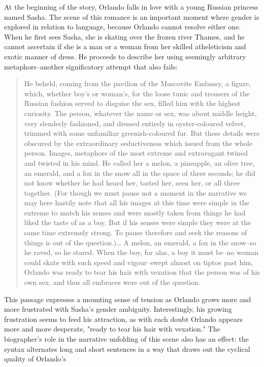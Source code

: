 \documentclass[11pt]{article}
\begin{document}
At the beginning of the story, Orlando falls in love with a young
Russian princess named Sasha. The scene of this romance is an
important moment where gender is explored in relation to language,
because Orlando cannot resolve either one. When he first sees Sasha,
she is skating over the frozen river Thames, and he cannot ascertain
if she is a man or a woman from her skilled atheleticism and exotic
manner of dress. He proceeds to describe her using seemingly arbitrary
metaphors--another significatory attempt that also fails:
\begin{quote}
He beheld, coming from the pavilion of the Muscovite Embassy, a
figure, which, whether boy's or woman's, for the loose tunic and
trousers of the Russian fashion served to disguise the sex, filled him
with the highest curiosity. The person, whatever the name or sex, was
about middle height, very slenderly fashioned, and dressed entirely in
oyster-coloured velvet, trimmed with some unfamiliar greenish-coloured
fur. But these details were obscured by the extraordinary
seductiveness which issued from the whole person. Images, metaphors of
the most extreme and extravagant twined and twisted in his mind. He
called her a melon, a pineapple, an olive tree, an emerald, and a fox
in the snow all in the space of three seconds; he did not know whether
he had heard her, tasted her, seen her, or all three together. (For
though we must pause not a moment in the narrative we may here hastily
note that all his images at this time were simple in the extreme to
match his senses and were mostly taken from things he had liked the
taste of as a boy. But if his senses were simple they were at the same
time extremely strong. To pause therefore and seek the reasons of
things is out of the question.)\ldots{} A melon, an emerald, a fox in the
snow--so he raved, so he stared. When the boy, for alas, a boy it must
be--no woman could skate with such speed and vigour--swept almost on
tiptoe past him, Orlando was ready to tear his hair with vexation that
the person was of his own sex, and thus all embraces were out of the
question. 
\end{quote}
This passage expresses a mounting sense of tension as Orlando grows
more and more frustrated with Sasha's gender ambiguity. Interestingly,
his growing frustration seems to feed his attraction, as with each
doubt Orlando appears more and more desperate, "ready to tear his hair
with vexation." The biographer's role in the narrative unfolding of
this scene also has an effect: the syntax alternates long and short
sentences in a way that draws out the cyclical quality of Orlando's
\end{document}
